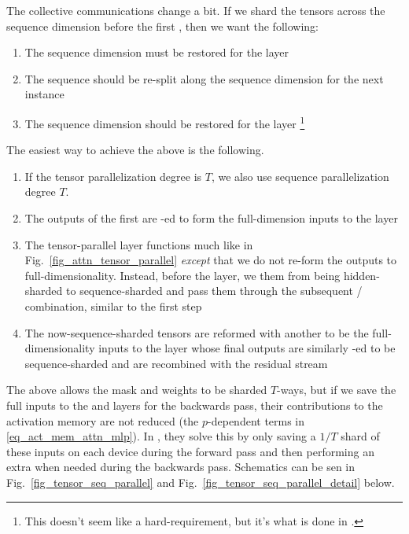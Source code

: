 \documentclass[11pt]{article}
\begin{document}
The collective communications change a bit. If we shard the tensors across the sequence dimension
before the first , then we want the following:
\begin{enumerate}
\item The sequence dimension must be restored for the  layer
\item The sequence should be re-split along the sequence dimension for the next  instance
\item The sequence dimension should be restored for the  layer \footnote{This doesn't
    seem like a hard-requirement, but it's what is done in \cite{korthikanti2022reducing}.}
\end{enumerate}

The easiest way to achieve the above is the following.
\begin{enumerate}
    \item If the tensor parallelization degree is $ T $, we also use sequence parallelization degree $ T
        $.
    \item The outputs of the first  are -ed to form the full-dimension
        inputs to the   layer
    \item The tensor-parallel  layer functions much like in
        Fig.~\ref{fig_attn_tensor_parallel} \textit{except} that we do not re-form the outputs to
        full-dimensionality.  Instead, before the  layer, we  them
        from being hidden-sharded to sequence-sharded and pass them through the subsequent
        / combination, similar to the first step
    \item The now-sequence-sharded tensors are reformed with another  to be the full-dimensionality inputs to the
         layer whose final outputs are similarly -ed to be
        sequence-sharded and are recombined with the residual stream
\end{enumerate}
The above allows the  mask and  weights to be sharded $ T
$-ways, but if we save the full inputs to the  and   layers
for the backwards pass, their contributions to the activation memory are not reduced (the $ p
$-dependent terms in \eqref{eq_act_mem_attn_mlp}). In \cite{korthikanti2022reducing}, they solve
this by only saving a $ 1/T $ shard of these inputs on each device during the forward pass and then
performing an extra  when needed during the backwards pass. Schematics can be
sen in Fig.~\ref{fig_tensor_seq_parallel} and Fig.~\ref{fig_tensor_seq_parallel_detail} below.
\end{document}
